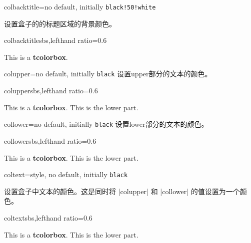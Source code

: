 \begin{docTcbKey}{colbacktitle}{=}{no default, initially \texttt{black!50!white}}

设置盒子的的标题区域的背景颜色。
\begin{exdispExample*}{colbacktitle}{sbs,lefthand ratio=0.6}
\begin{tcolorbox}[colbacktitle=red!50!white,
title=My title,coltitle=black,
fonttitle=\bfseries]
This is a \textbf{tcolorbox}.
\end{tcolorbox}
\end{exdispExample*}
\end{docTcbKey}




\begin{docTcbKey}{colupper}{=}{no default, initially \texttt{black}}
  设置upper部分的文本的颜色。
  \begin{exdispExample*}{colupper}{sbs,lefthand ratio=0.6}
  \begin{tcolorbox}[colupper=red!75!black]
  This is a \textbf{tcolorbox}.
  \tcblower
  This is the lower part.
  \end{tcolorbox}
  \end{exdispExample*}
  \end{docTcbKey}
  
  
  \begin{docTcbKey}{collower}{=}{no default, initially \texttt{black}}
  设置lower部分的文本的颜色。
  \begin{exdispExample*}{collower}{sbs,lefthand ratio=0.6}
  \begin{tcolorbox}[collower=red!75!black]
  This is a \textbf{tcolorbox}.
  \tcblower
  This is the lower part.
  \end{tcolorbox}
  \end{exdispExample*}
  \end{docTcbKey}
  
  
  \begin{docTcbKey}{coltext}{=}{style, no default, initially \texttt{black}}
  
  设置盒子中文本的颜色。这是同时将 |colupper| 和 |collower| 的值设置为一个颜色。
  \begin{exdispExample*}{coltext}{sbs,lefthand ratio=0.6}
  \begin{tcolorbox}[coltext=red!75!black]
  This is a \textbf{tcolorbox}.
  \tcblower
  This is the lower part.
  \end{tcolorbox}
  \end{exdispExample*}
  \end{docTcbKey}
  

